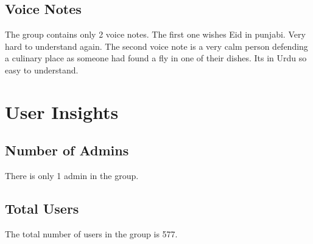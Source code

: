 \documentclass[12pt]{article}
\begin{document}
\subsection{Voice Notes}
The group contains only 2 voice notes. The first one wishes Eid in punjabi. Very hard to understand again. The second voice note is a very calm person defending a culinary place as someone had found a fly in one of their dishes. Its in Urdu so easy to understand.

\section{User Insights}
\subsection{Number of Admins}
There is only 1 admin in the group.

\subsection{Total Users}
The total number of users in the group is 577.
\end{document}
